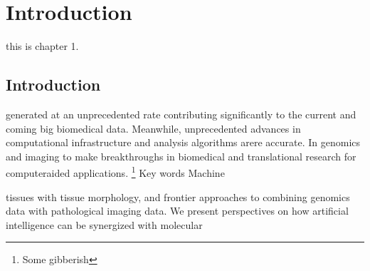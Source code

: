 \chapter{Introduction}
this is chapter 1.
\section{Introduction}
generated at an unprecedented rate contributing significantly to the current and coming big biomedical
data. Meanwhile, unprecedented advances in computational infrastructure and analysis algorithms arere accurate. In 
genomics and imaging to make breakthroughs in biomedical and translational research for computeraided
applications. \blindtext \footnote{Some gibberish}
Key words Machine

\begin{singlespace}
tissues with tissue morphology, and frontier approaches to combining genomics data with pathological
imaging data. We present perspectives on how artificial intelligence can be synergized with molecular
\end{singlespace}